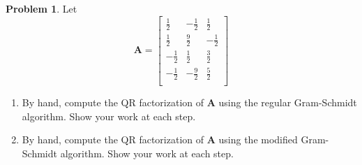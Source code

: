\documentclass[12pt]{article}
\theoremstyle{definition}
\newtheorem{problem}{Problem}
\renewcommand{\vec}{\mathbf}
\begin{document}
\clearpage
\begin{problem}
    Let \[
        \vec{A} = 
        \begin{bmatrix}
        \frac{1}{2} & -\frac{1}{2} & \frac{1}{2} \\
        \frac{1}{2} & \frac{9}{2} & -\frac{1}{2} \\
        -\frac{1}{2} & \frac{1}{2} & \frac{3}{2} \\
        -\frac{1}{2} & -\frac{9}{2} & \frac{5}{2} \\
        \end{bmatrix}
    \]
    \begin{enumerate}
        \item By hand, compute the QR factorization of $\vec{A}$ using the regular Gram-Schmidt algorithm.
        Show your work at each step.
        \item By hand, compute the QR factorization of $\vec{A}$ using the modified Gram-Schmidt algorithm.
        Show your work at each step.
    \end{enumerate}
\end{problem}
\end{document}
